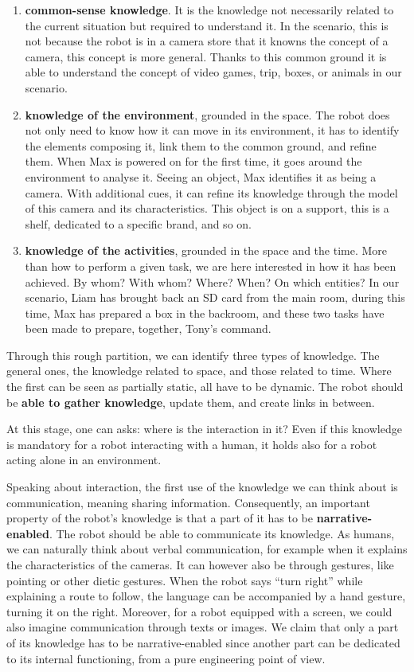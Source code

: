 \begin{enumerate}
  \item \textbf{common-sense knowledge}. It is the knowledge not necessarily related to the current situation but required to understand it. In the scenario, this is not because the robot is in a camera store that it knowns the concept of a camera, this concept is more general. Thanks to this common ground it is able to understand the concept of video games, trip, boxes, or animals in our scenario.
  \item \textbf{knowledge of the environment}, grounded in the space. The robot does not only need to know how it can move in its environment, it has to identify the elements composing it, link them to the common ground, and refine them. When Max is powered on for the first time, it goes around the environment to analyse it. Seeing an object, Max identifies it as being a camera. With additional cues, it can refine its knowledge through the model of this camera and its characteristics. This object is on a support, this is a shelf, dedicated to a specific brand, and so on.
  \item \textbf{knowledge of the activities}, grounded in the space and the time. More than how to perform a given task, we are here interested in how it has been achieved. By whom? With whom? Where? When? On which entities? In our scenario, Liam has brought back an SD card from the main room, during this time, Max has prepared a box in the backroom, and these two tasks have been made to prepare, together, Tony's command.
\end{enumerate}

Through this rough partition, we can identify three types of knowledge. The general ones, the knowledge related to space, and those related to time. Where the first can be seen as partially static, all have to be dynamic. The robot should be \textbf{able to gather knowledge}, update them, and create links in between.

At this stage, one can asks: where is the interaction in it? Even if this knowledge is mandatory for a robot interacting with a human, it holds also for a robot acting alone in an environment.

Speaking about interaction, the first use of the knowledge we can think about is communication, meaning sharing information. Consequently, an important property of the robot's knowledge is that a part of it has to be \textbf{narrative-enabled}. The robot should be able to communicate its knowledge. As humans, we can naturally think about verbal communication, for example when it explains the characteristics of the cameras. It can however also be through gestures, like pointing or other dietic gestures. When the robot says ``turn right'' while explaining a route to follow, the language can be accompanied by a hand gesture, turning it on the right. Moreover, for a robot equipped with a screen, we could also imagine communication through texts or images. We claim that only a part of its knowledge has to be narrative-enabled since another part can be dedicated to its internal functioning, from a pure engineering point of view.

